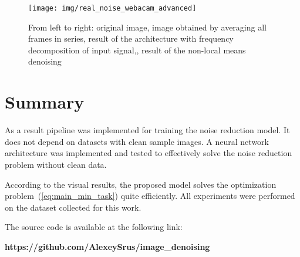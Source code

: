 \documentclass[runningheads]{llncs}
\begin{document}
\begin{figure}
	\centering
	\texttt{[image: img/real\_noise\_webacam\_advanced]}
	\caption{From left to right: original image, image obtained by averaging all frames in series, result of the architecture with frequency decomposition of input signal,, result of the non-local means denoising}
	\label{fig:real_noise_webacam_advanced}
\end{figure}

\section{Summary}
As a result pipeline was implemented for training the noise reduction model. It does not depend on datasets with clean sample images.
A neural network architecture was implemented and tested to effectively solve the noise reduction problem without clean data.

According to the visual results, the proposed model solves the optimization problem~(\ref{eq:main_min_task}) quite efficiently. All experiments were performed on the dataset collected for this work.

The source code is available at the following link:

\textbf{https://github.com/AlexeySrus/image\_denoising}
\end{document}
